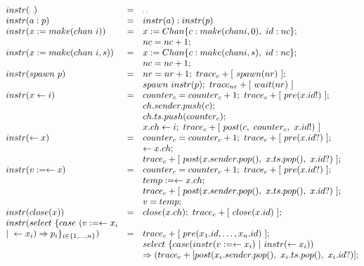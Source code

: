 \begin{align*}
  \begin{matrix*}[l]
    instr(\text{\textvisiblespace}) &=& \text{\textvisiblespace}\\
    instr(a : p) &=& instr(a) : instr(p)\\
    instr(x := make(chan\ i)) & = & x := Chan\{c: make(chan i, 0),\ id: nc\};\\
                             &  & nc = nc + 1;\\
    instr(x := make(chan\ i, s)) & = & x := Chan\{c: make(chan i, s),\ id: nc\};\\
                             &  & nc = nc + 1;\\
    instr(spawn\ p) & = & nr = nr + 1;\ trace_c + [\ spawn(nr)\ ];\\
                   &   & spawn\ instr(p);\ trace_{nr} + [\ wait(nr)\ ] \\
    instr( x \leftarrow i ) & = & counter_c = counter_c + 1;\ trace_c + [\ pre(x.id!)\ ];\\
      & & ch.sender.push(c);\\
      & & ch.ts.push(counter_c);\\
      & & x.ch \leftarrow i;\ trace_c + [\ post(c,\ counter_c,\ x.id!)\ ]\\
    instr( \leftarrow x) & = & counter_c = counter_c + 1;\ trace_c + [\ pre(x.id?)\ ];\\
      & & \leftarrow x.ch;\\
      & & trace_c + [\ post(x.sender.pop(),\ x.ts.pop(),\ x.id?) \ ];\\
    instr( v := \leftarrow x) & = & counter_c = counter_c + 1;\ trace_c + [\ pre(x.id?)\ ];\\
      & & temp := \leftarrow x.ch;\\
      & & trace_c + [\ post(x.sender.pop(),\ x.ts.pop(),\ x.id?) \ ];\\
      & & v = temp;\\
    instr( close(x) ) & = & close(x.ch);\ trace_c + [\ close(x.id)\ ];\\
    instr(select\ \{case\ (v := \leftarrow x_i\\ 
      |\ \leftarrow x_i) \Rightarrow p_i\}_{i \in \{1, \ldots, n\}}) & = & trace_c +
      [\ pre(x_1.id, \ldots, x_n.id)\ ];\\
      & & select\ \{case (instr(v := \leftarrow x_i)\ |\ instr(\leftarrow x_i))\\
      & & \Rightarrow (trace_c + [post(x_i.sender.pop(),\ x_i.ts.pop(),\ x_i.id?)];\\

\end{matrix*}
\end{align*}
